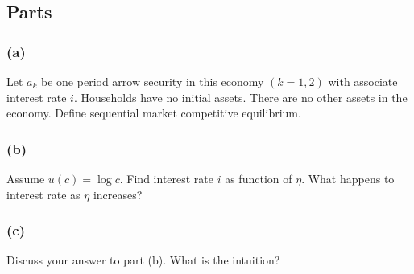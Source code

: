 \documentclass[10pt, a4paper]{article}
\begin{document}
\subsection*{Parts}
\subsubsection*{(a)}
Let $a_k$ be one period arrow security in this economy $(k = 1,2)$ with associate interest rate $i$. Households have no initial assets. There are no other assets in the economy. Define sequential market competitive equilibrium.

\subsubsection*{(b)}
Assume $u(c) = \log c$. Find interest rate $i$ as function of $\eta$. What happens to interest rate as $\eta$ increases?

\subsubsection*{(c)}
Discuss your answer to part (b). What is the intuition?
\end{document}
